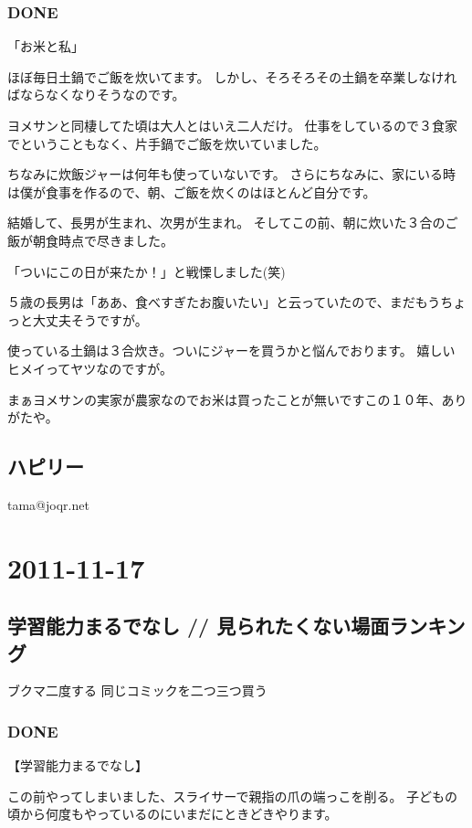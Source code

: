\documentclass[11pt]{article}
\begin{document}
\subsubsection{\textbf{DONE}}
\label{sec-35_1_1}

「お米と私」

ほぼ毎日土鍋でご飯を炊いてます。
しかし、そろそろその土鍋を卒業しなければならなくなりそうなのです。

ヨメサンと同棲してた頃は大人とはいえ二人だけ。
仕事をしているので３食家でということもなく、片手鍋でご飯を炊いていました。

ちなみに炊飯ジャーは何年も使っていないです。
さらにちなみに、家にいる時は僕が食事を作るので、朝、ご飯を炊くのはほとんど自分です。

結婚して、長男が生まれ、次男が生まれ。
そしてこの前、朝に炊いた３合のご飯が朝食時点で尽きました。

「ついにこの日が来たか！」と戦慄しました(笑)

５歳の長男は「ああ、食べすぎたお腹いたい」と云っていたので、まだもうちょっと大丈夫そうですが。

使っている土鍋は３合炊き。ついにジャーを買うかと悩んでおります。
嬉しいヒメイってヤツなのですが。

まぁヨメサンの実家が農家なのでお米は買ったことが無いですこの１０年、ありがたや。
\subsection{ハピリー}
\label{sec-35_2}

tama@joqr.net
\section{2011-11-17}
\label{sec-36}
\subsection{学習能力まるでなし // 見られたくない場面ランキング}
\label{sec-36_1}

ブクマ二度する
同じコミックを二つ三つ買う
\subsubsection{\textbf{DONE}}
\label{sec-36_1_1}

【学習能力まるでなし】

この前やってしまいました、スライサーで親指の爪の端っこを削る。
子どもの頃から何度もやっているのにいまだにときどきやります。
\end{document}
